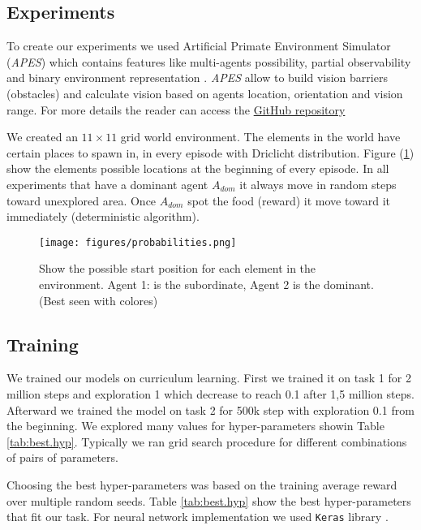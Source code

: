 \documentclass{article}
\begin{document}
\subsection{Experiments}
To create our experiments we used Artificial Primate Environment Simulator (\textit{APES}) which contains features like multi-agents possibility, partial observability and binary environment representation \cite{APES}. \textit{APES} allow to build vision barriers (obstacles) and calculate vision based on agents location, orientation and vision range. For more details the reader can access the \href{https://github.com/aqeel13932/APES}{GitHub repository}

We created an $11\times11$ grid world environment. The elements in the world have certain places to spawn in, in every episode with Driclicht distribution. Figure (\ref{fig:probabilities}) show the elements possible locations at the beginning of every episode. In all experiments that have a dominant agent \(A_{dom}\) it always move in random steps toward unexplored area. Once \(A_{dom}\) spot the food (reward) it move toward it immediately (deterministic algorithm).
\begin{figure}[H]
    \centering
    \texttt{[image: figures/probabilities.png]}
    \caption{Show the possible start position for each element in the environment. Agent 1: is the subordinate, Agent 2 is the dominant.(Best seen with colores)}
    \label{fig:probabilities}
\end{figure}

\subsection{Training}
We trained our models on curriculum learning. First we trained it on task 1 for 2 million steps and exploration 1 which decrease to reach 0.1 after 1,5 million steps. Afterward we trained the model on task 2 for 500k step with exploration 0.1 from the beginning. We explored many values for hyper-parameters showin Table \ref{tab:best.hyp}. Typically we ran grid search procedure for different combinations of pairs of parameters.
\par Choosing the best hyper-parameters was based on the training average reward over multiple random seeds. Table \ref{tab:best.hyp}  show the best hyper-parameters that fit our task. For neural network implementation we used \texttt{Keras} library \cite{chollet2015keras}.
\end{document}
